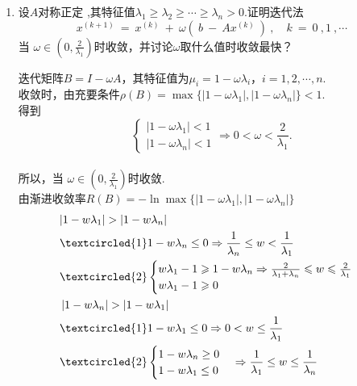 \documentclass[a4paper]{article}
\begin{document}
\begin{enumerate}
  \item 设$A$对称正定 ,其特征值$\lambda_1\geq\lambda_2\geq\cdots\geq\lambda_n>0.$证明迭代法$$x^{(k+1)}\:=\:x^{(k)}\:+\:\omega(\:b\:-\:Ax^{(k)}\:)\:,\quad k\:=\:0\:,1\:,\cdots $$当 $\omega\in\left(0,\frac{2}{\lambda_{1}}\right)$时收敛，并讨论$\omega$取什么值时收敛最快？
  \begin{solution}
    迭代矩阵$B=I-\omega A$，其特征值为$\mu_i=1-\omega\lambda_i$，$i=1,2,\cdots,n$.\\
    收敛时，由充要条件$\rho(B)=\max\{|1-\omega\lambda_1|,|1-\omega\lambda_n|\}<1$.\\
    得到
    \[\begin{cases}
      |1-\omega\lambda_1|<1\\
      |1-\omega\lambda_n|<1
    \end{cases}\Rightarrow 0<\omega<\frac{2}{\lambda_1}.\]\\
    所以，当 $\omega\in\left(0,\frac{2}{\lambda_{1}}\right)$时收敛.\\
    由渐进收敛率$R(B)=-\ln\max\{|1-\omega\lambda_1|,|1-\omega\lambda_n|\}$
    \begin{align*}
      &|1-w\lambda_1|>|1-w\lambda_n|\\
      &\textcircled{1}1-w\lambda_n\leq0\Rightarrow\frac{1}{\lambda_n}\leq w<\frac{1}{\lambda_1}\\
      &\textcircled{2}
      \begin{cases}
        w\lambda_1-1\geqslant1-w\lambda_n\Rightarrow\frac{2}{\lambda_1+\lambda_n}\leqslant w\leqslant\frac{2}{\lambda_1}\\w\lambda_1-1\geqslant0\end{cases}\\
        &\left|1-w\lambda_n\right|>\left|1-w\lambda_1\right|\\
        &\textcircled{1}1-w\lambda_{1}\leq0\Rightarrow0<w\leq\frac{1}{\lambda_{1}}\\
        &\textcircled{2}\begin{cases}1-w\lambda_{n}\geq0\\1-w\lambda_{1}\leq0\end{cases}\Rightarrow\frac{1}{\lambda_{1}}\leq w\leq\frac{1}{\lambda_{n}}
    \end{align*}
  \end{solution}



\end{enumerate}
\end{document}
